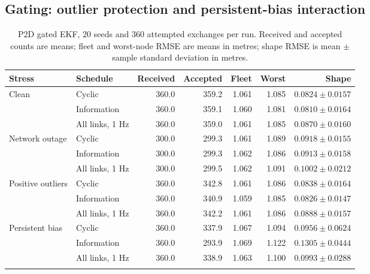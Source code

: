 \subsection{Gating: outlier protection and persistent-bias interaction}
\begin{table}[htbp]
\centering\small
\caption{P2D gated EKF, 20 seeds and 360 attempted exchanges per run. Received and accepted counts are means; fleet and worst-node RMSE are means in metres; shape RMSE is mean \(\pm\) sample standard deviation in metres.}
\label{tab:p2d_gated}
\begin{tabular}{llrrrrr}
\toprule
Stress & Schedule & Received & Accepted & Fleet & Worst & Shape \\
\midrule
Clean & Cyclic & 360.0 & 359.2 & 1.061 & 1.085 & \(0.0824\pm0.0157\) \\
 & Information & 360.0 & 359.1 & 1.060 & 1.081 & \(0.0810\pm0.0164\) \\
 & All links, 1 Hz & 360.0 & 359.0 & 1.061 & 1.085 & \(0.0870\pm0.0160\) \\
\addlinespace
Network outage & Cyclic & 300.0 & 299.3 & 1.061 & 1.089 & \(0.0918\pm0.0155\) \\
 & Information & 300.0 & 299.3 & 1.062 & 1.086 & \(0.0913\pm0.0158\) \\
 & All links, 1 Hz & 300.0 & 299.5 & 1.062 & 1.091 & \(0.1002\pm0.0212\) \\
\addlinespace
Positive outliers & Cyclic & 360.0 & 342.8 & 1.061 & 1.086 & \(0.0838\pm0.0164\) \\
 & Information & 360.0 & 340.9 & 1.059 & 1.085 & \(0.0826\pm0.0147\) \\
 & All links, 1 Hz & 360.0 & 342.2 & 1.061 & 1.086 & \(0.0888\pm0.0157\) \\
\addlinespace
Persistent bias & Cyclic & 360.0 & 337.9 & 1.067 & 1.094 & \(0.0956\pm0.0624\) \\
 & Information & 360.0 & 293.9 & 1.069 & 1.122 & \(0.1305\pm0.0444\) \\
 & All links, 1 Hz & 360.0 & 338.9 & 1.063 & 1.100 & \(0.0993\pm0.0288\) \\
\addlinespace
\bottomrule
\end{tabular}
\end{table}

